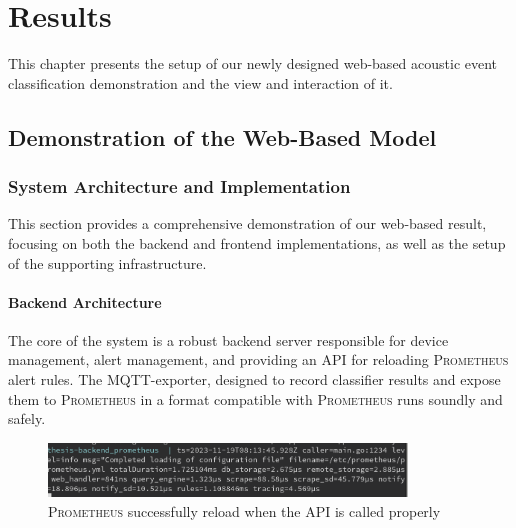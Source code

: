 \chapter{Results}
This chapter presents the setup of our newly designed web-based acoustic event classification demonstration and the view and interaction of it.

\section{Demonstration of the Web-Based Model}


\subsection{System Architecture and Implementation}
This section provides a comprehensive demonstration of our web-based result, focusing on both the backend and frontend implementations, as well as the setup of the supporting infrastructure.

\subsubsection{Backend Architecture}
The core of the system is a robust backend server responsible for device management, alert management, and providing an API for reloading \textsc{Prometheus} alert rules. The MQTT-exporter, designed to record classifier results and expose them to \textsc{Prometheus} in a format compatible with \textsc{Prometheus} runs soundly and safely.

\begin{figure}[htbp]
  \centering
  \includegraphics[width=0.85\textwidth]{Pictures/prometheusreload}
  \caption{\label{fig:prometheusreload}\textsc{Prometheus} successfully reload when the API is called properly}
\end{figure}

